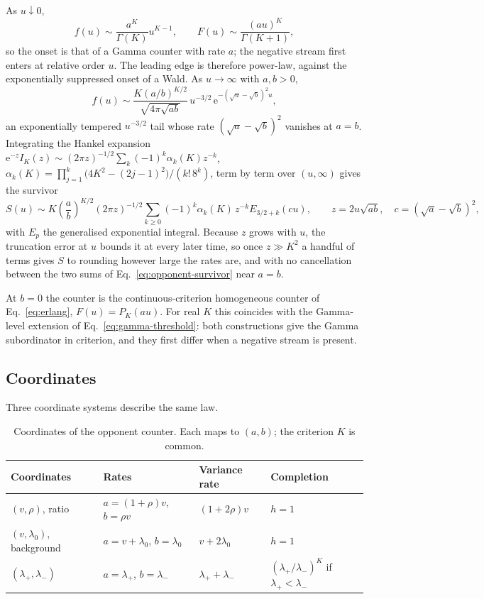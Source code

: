 \documentclass[12pt]{article}
\newcommand{\e}{\mathrm{e}}
\theoremstyle{definition}
\theoremstyle{plain}
\theoremstyle{remark}
\begin{document}
As $u\downarrow0$,
\begin{equation}
 f(u)\sim\frac{a^K}{\Gamma(K)}u^{K-1},\qquad F(u)\sim\frac{(au)^K}{\Gamma(K+1)},\label{eq:opponent-onset}
\end{equation}
so the onset is that of a Gamma counter with rate $a$; the negative stream first enters at relative order $u$. The leading edge is therefore power-law, against the exponentially suppressed onset of a Wald. As $u\to\infty$ with $a,b>0$,
\begin{equation}
 f(u)\sim\frac{K(a/b)^{K/2}}{\sqrt{4\pi\sqrt{ab}}}\,u^{-3/2}\,\e^{-(\sqrt a-\sqrt b)^2u},\label{eq:opponent-tail}
\end{equation}
an exponentially tempered $u^{-3/2}$ tail whose rate $(\sqrt a-\sqrt b)^2$ vanishes at $a=b$. Integrating the Hankel expansion $\e^{-z}I_K(z)\sim(2\pi z)^{-1/2}\sum_k(-1)^k\alpha_k(K)z^{-k}$, $\alpha_k(K)=\prod_{j=1}^k\big(4K^2-(2j-1)^2\big)/(k!\,8^k)$, term by term over $(u,\infty)$ gives the survivor
\begin{equation}
 S(u)\sim K\left(\frac ab\right)^{K/2}(2\pi z)^{-1/2}\sum_{k\geq0}(-1)^k\alpha_k(K)\,z^{-k}E_{3/2+k}(cu),\qquad z=2u\sqrt{ab},\quad c=(\sqrt a-\sqrt b)^2,\label{eq:opponent-hankel-survivor}
\end{equation}
with $E_p$ the generalised exponential integral. Because $z$ grows with $u$, the truncation error at $u$ bounds it at every later time, so once $z\gg K^2$ a handful of terms gives $S$ to rounding however large the rates are, and with no cancellation between the two sums of Eq.~\eqref{eq:opponent-survivor} near $a=b$.

At $b=0$ the counter is the continuous-criterion homogeneous counter of Eq.~\eqref{eq:erlang}, $F(u)=P_K(au)$. For real $K$ this coincides with the Gamma-level extension of Eq.~\eqref{eq:gamma-threshold}: both constructions give the Gamma subordinator in criterion, and they first differ when a negative stream is present.

\subsection{Coordinates}
Three coordinate systems describe the same law.
\begin{table}[htbp]
\centering\small
\caption{Coordinates of the opponent counter. Each maps to $(a,b)$; the criterion $K$ is common.}
\label{tab:opponent}
\begin{tabular}{L{2.8cm}L{3.6cm}L{3.0cm}L{4.1cm}}
\toprule
Coordinates & Rates & Variance rate & Completion\\
\midrule
$(v,\rho)$, ratio & $a=(1+\rho)v$, $b=\rho v$ & $(1+2\rho)v$ & $h=1$\\
\addlinespace
$(v,\lambda_0)$, background & $a=v+\lambda_0$, $b=\lambda_0$ & $v+2\lambda_0$ & $h=1$\\
\addlinespace
$(\lambda_+,\lambda_-)$ & $a=\lambda_+$, $b=\lambda_-$ & $\lambda_++\lambda_-$ & $(\lambda_+/\lambda_-)^K$ if $\lambda_+<\lambda_-$\\
\bottomrule
\end{tabular}
\end{table}
\end{document}
